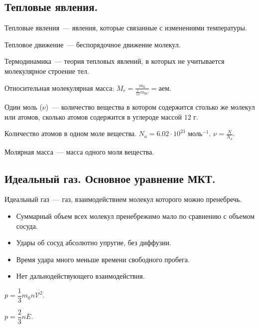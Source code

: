 \documentclass[12pt]{article}
\begin{document}
	\subsection{Тепловые явления.}
	\begin{definition}
		Тепловые явления~--- явления, которые связанные с изменениями температуры.
	\end{definition}
	\begin{definition}
		Тепловое движение~--- беспорядочное движение молекул.
	\end{definition}
	\begin{definition}
		Термодинамика~--- теория тепловых явлений, в которых не учитывается молекулярное строение тел.
	\end{definition}
	\begin{definition}
		Относительная молекулярная масса: $M_r = \frac{m_0}{\frac{1}{12} m_{0C}} = \text{аем}$.
	\end{definition}
	\begin{definition}
		Один моль ($\nu$)~--- количество вещества в котором содержится столько же молекул или атомов, сколько атомов содержится в углероде массой $12$ г.
	\end{definition}
	\begin{definition}
		Количество атомов в одном моле вещества. $N_a = 6.02 \cdot 10^{23} \text{ моль}^{-1}$. $\nu = \frac{N}{N_a}$.
	\end{definition}
	\begin{definition}
		Молярная масса~--- масса одного моля вещества.
	\end{definition}
	\subsection{Идеальный газ. Основное уравнение МКТ.}
	\begin{definition}
		Идеальный газ~--- газ, взаимодействием молекул которого можно пренебречь.
		\begin{itemize}
			\item Суммарный объем всех молекул пренебрежимо мало по сравнению с объемом сосуда.
			\item Удары об сосуд абсолютно упругие, без диффузии.
			\item Время удара много меньше времени свободного пробега.
			\item Нет дальнодействующего взаимодействия.
		\end{itemize}
	\end{definition}
	\begin{definition}
		$p = \dfrac{1}{3} m_0 n \overline{\mathcal{V}^2}$.
	\end{definition}
	\begin{corollary}
		$p = \dfrac{2}{3} n \overline{E}$.
	\end{corollary}
\end{document}
